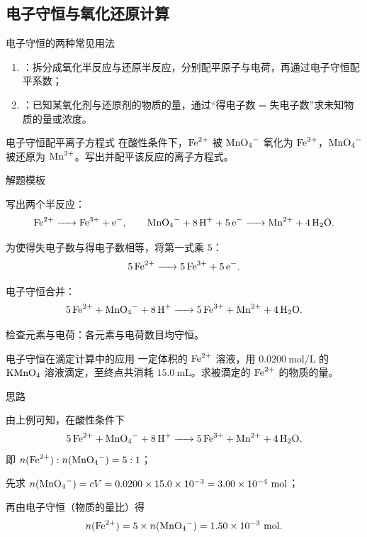 \documentclass[a4paper,11pt]{ctexart}
\begin{document}
\subsection{电子守恒与氧化还原计算}

\begin{summarybox}{电子守恒的两种常见用法}
  \begin{enumerate}
    \item {}：拆分成氧化半反应与还原半反应，分别配平原子与电荷，再通过电子守恒配平系数；
    \item {}：已知某氧化剂与还原剂的物质的量，通过“得电子数 = 失电子数”求未知物质的量或浓度。
  \end{enumerate}
\end{summarybox}

\begin{examplebox}{电子守恒配平离子方程式}
  在酸性条件下，$\ce{Fe^{2+}}$ 被 $\ce{MnO4^-}$ 氧化为 $\ce{Fe^{3+}}$，$\ce{MnO4^-}$ 被还原为 $\ce{Mn^{2+}}$。写出并配平该反应的离子方程式。

  \begin{proofbox}{解题模板}
    \begin{focuspoints}
      \item 写出两个半反应：
      \[
        \ce{Fe^{2+} -> Fe^{3+} + e^-},\qquad
        \ce{MnO4^- + 8H^+ + 5e^- -> Mn^{2+} + 4H2O}.
      \]
      \item 为使得失电子数与得电子数相等，将第一式乘 $5$：
      \[
        \ce{5Fe^{2+} -> 5Fe^{3+} + 5e^-}.
      \]
      \item 电子守恒合并：
      \[
        \ce{5Fe^{2+} + MnO4^- + 8H^+ -> 5Fe^{3+} + Mn^{2+} + 4H2O}.
      \]
      \item 检查元素与电荷：各元素与电荷数目均守恒。
    \end{focuspoints}
  \end{proofbox}
\end{examplebox}

\begin{examplebox}{电子守恒在滴定计算中的应用}
  一定体积的 $\ce{Fe^{2+}}$ 溶液，用 $0.0200\ \mathrm{mol/L}$ 的 $\ce{KMnO4}$ 溶液滴定，至终点共消耗 $15.0\ \mathrm{mL}$。求被滴定的 $\ce{Fe^{2+}}$ 的物质的量。

  \begin{proofbox}{思路}
    \begin{focuspoints}
      \item 由上例可知，在酸性条件下
      \[
        \ce{5Fe^{2+} + MnO4^- + 8H^+ -> 5Fe^{3+} + Mn^{2+} + 4H2O},
      \]
      即 $n(\ce{Fe^{2+}}) : n(\ce{MnO4^-}) = 5 : 1$；
      \item 先求 $n(\ce{MnO4^-}) = cV = 0.0200 \times 15.0\times 10^{-3} = 3.00\times 10^{-4}\ \mathrm{mol}$；
      \item 再由电子守恒（物质的量比）得
      \[
        n(\ce{Fe^{2+}}) = 5 \times n(\ce{MnO4^-}) = 1.50\times 10^{-3}\ \mathrm{mol}.
      \]
    \end{focuspoints}
  \end{proofbox}
\end{examplebox}
\end{document}
